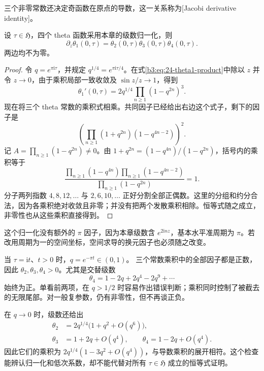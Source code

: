 三个非零常数还决定奇函数在原点的导数，这一关系称为[Jacobi derivative identity]。

\begin{proposition}\label{b3:prop:24-jacobi-derivative}
设 \(\tau\in\mathfrak H\)，四个 theta 函数采用本章的级数归一化，则
\begin{equation}\label{b3:eq:24-derivative-identity}
 \partial_z\theta_1(0,\tau)
 =\theta_2(0,\tau)\theta_3(0,\tau)\theta_4(0,\tau).
\end{equation}
两边均不为零。
\end{proposition}
\begin{proof}
令 \(q=e^{\pi\mathrm i\tau}\)，并规定
\(q^{1/4}=e^{\pi\mathrm i\tau/4}\)。在式\eqref{b3:eq:24-theta1-product}中除以 \(z\) 并令 \(z\to0\)，由于乘积局部一致收敛及 \(\sin z/z\to1\)，得到
\[
 \theta_1'(0,\tau)
 =2q^{1/4}\prod_{n\ge1}(1-q^{2n})^3.
\]
现在将三个 theta 常数的乘积式相乘。共同因子已经给出右边这个式子，剩下的因子是
\[
 \left(\prod_{n\ge1}
    (1+q^{2n})(1-q^{4n-2})\right)^2.
\]
记 \(A=\prod_{n\ge1}(1-q^{2n})\ne0\)。由
\(1+q^{2n}=(1-q^{4n})/(1-q^{2n})\)，括号内的乘积等于
\[
 \frac{\displaystyle
        \prod_{n\ge1}(1-q^{4n})
        \prod_{n\ge1}(1-q^{4n-2})}
      {\displaystyle\prod_{n\ge1}(1-q^{2n})}=1.
\]
分子两列指数 \(4,8,12,\ldots\) 与 \(2,6,10,\ldots\) 正好分割全部正偶数。这里的分组和约分合法，因为各乘积绝对收敛且非零；并没有把两个发散乘积相除。恒等式随之成立，非零性也从这些乘积直接得到。
\end{proof}

这个归一化没有额外的 \(\pi\) 因子，因为本章级数含
\(e^{2\mathrm inz}\)，基本水平准周期为 \(\pi\)。若改用周期为一的空间坐标，空间求导的换元因子也必须随之改变。

当 \(\tau=\mathrm it\)、\(t>0\) 时，\(q=e^{-\pi t}\in(0,1)\)。
三个常数乘积中的全部因子都是正数，因此
\(\theta_2,\theta_3,\theta_4>0\)。尤其是交替级数
\[
 \theta_4=1-2q+2q^4-2q^9+\cdots
\]
始终为正。单看前两项，在 \(q>1/2\) 时容易作出错误判断；乘积同时控制了被截去的无限尾部。对一般复参数，仍有非零性，但不再谈正负。

在 \(q\to0\) 时，级数还给出
\[
 \begin{aligned}
 \theta_2&=2q^{1/4}\bigl(1+q^2+O(q^6)\bigr),\\
 \theta_3&=1+2q+O(q^4),\qquad
 \theta_4=1-2q+O(q^4).
 \end{aligned}
\]
因此它们的乘积为 \(2q^{1/4}(1-3q^2+O(q^4))\)，与导数乘积的展开相符。这个检查能辨认归一化和低次系数，却不能代替对所有 \(\tau\in\mathfrak H\) 成立的恒等式证明。

